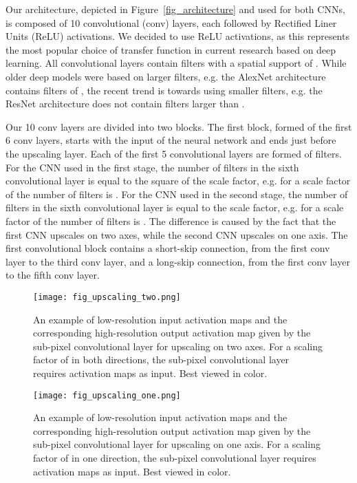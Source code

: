 \documentclass{ieeeaccess}
\begin{document}
Our architecture, depicted in Figure~\ref{fig_architecture} and used for both CNNs, is composed of 10 convolutional (conv) layers, each followed by Rectified Liner Units (ReLU) \cite{Nair-ICML-2010} activations. We decided to use ReLU activations, as this represents the most popular choice of transfer function in current research based on deep learning. All convolutional layers contain filters with a spatial support of . While older deep models were based on larger filters, e.g. the AlexNet \cite{Hinton-NIPS-2012} architecture contains filters of , the recent trend is towards using smaller filters, e.g. the ResNet \cite{He-CVPR-2016} architecture does not contain filters larger than .

Our 10 conv layers are divided into two blocks. The first block, formed of the first 6 conv layers, starts with the input of the neural network and ends just before the upscaling layer. Each of the first 5 convolutional layers are formed of  filters. For the CNN used in the first stage, the number of filters in the sixth convolutional layer is equal to the square of the scale factor, e.g. for a scale factor of  the number of filters is . For the CNN used in the second stage, the number of filters in the sixth convolutional layer is equal to the scale factor, e.g. for a scale factor of  the number of filters is . The difference is caused by the fact that the first CNN upscales on two axes, while the second CNN upscales on one axis. The first convolutional block contains a short-skip connection, from the first conv layer to the third conv layer, and a long-skip connection, from the first conv layer to the fifth conv layer.

\begin{figure}[t!]
\centering
\texttt{[image: fig\_upscaling\_two.png]}
\caption{An example of low-resolution input activation maps and the corresponding high-resolution output activation map given by the sub-pixel convolutional layer for upscaling on two axes. For a scaling factor of  in both directions, the sub-pixel convolutional layer requires  activation maps as input. Best viewed in color.}
\label{fig_upscaling_two}
\end{figure}

\begin{figure}[t!]
\centering
\texttt{[image: fig\_upscaling\_one.png]}
\caption{An example of low-resolution input activation maps and the corresponding high-resolution output activation map given by the sub-pixel convolutional layer for upscaling on one axis. For a scaling factor of  in one direction, the sub-pixel convolutional layer requires  activation maps as input. Best viewed in color.}
\label{fig_upscaling_one}
\end{figure}
\end{document}
